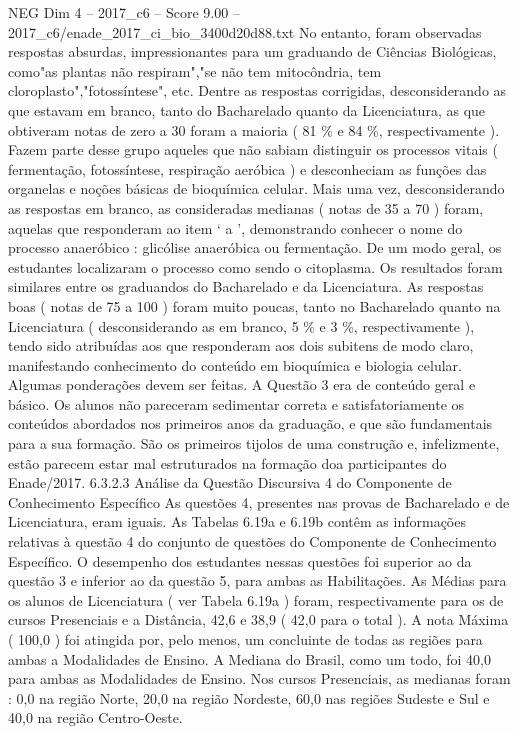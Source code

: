 \begin{textsample}{NEG Dim 4 – 2017\_c6 – Score 9.00 – 2017\_c6/enade\_2017\_ci\_bio\_3400d20d88.txt}
No entanto, foram observadas respostas absurdas, impressionantes para um graduando de Ciências Biológicas, como"as plantas não respiram","se não tem mitocôndria, tem cloroplasto","fotossíntese", etc.
Dentre as respostas corrigidas, desconsiderando as que estavam em branco, tanto do Bacharelado quanto da Licenciatura, as que obtiveram notas de zero a 30 foram a maioria ( 81 \% e 84 \%, respectivamente ).
Fazem parte desse grupo aqueles que não sabiam distinguir os processos vitais ( fermentação, fotossíntese, respiração aeróbica ) e desconheciam as funções das organelas e noções básicas de bioquímica celular.
Mais uma vez, desconsiderando as respostas em branco, as consideradas medianas ( notas de 35 a 70 ) foram, aquelas que responderam ao item ‘ a ’, demonstrando conhecer o nome do processo anaeróbico : glicólise anaeróbica ou fermentação.
De um modo geral, os estudantes localizaram o processo como sendo o citoplasma.
Os resultados foram similares entre os graduandos do Bacharelado e da Licenciatura.
As respostas boas ( notas de 75 a 100 ) foram muito poucas, tanto no Bacharelado quanto na Licenciatura ( desconsiderando as em branco, 5 \% e 3 \%, respectivamente ), tendo sido atribuídas aos que responderam aos dois subitens de modo claro, manifestando conhecimento do conteúdo em bioquímica e biologia celular.
Algumas ponderações devem ser feitas.
A Questão 3 era de conteúdo geral e básico.
Os alunos não pareceram sedimentar correta e satisfatoriamente os conteúdos abordados nos primeiros anos da graduação, e que são fundamentais para a sua formação.
São os primeiros tijolos de uma construção e, infelizmente, estão parecem estar mal estruturados na formação doa participantes do Enade/2017. 6.3.2.3 Análise da Questão Discursiva 4 do Componente de Conhecimento Específico As questões 4, presentes nas provas de Bacharelado e de Licenciatura, eram iguais.
As Tabelas 6.19a e 6.19b contêm as informações relativas à questão 4 do conjunto de questões do Componente de Conhecimento Específico.
O desempenho dos estudantes nessas questões foi superior ao da questão 3 e inferior ao da questão 5, para ambas as Habilitações.
As Médias para os alunos de Licenciatura ( ver Tabela 6.19a ) foram, respectivamente para os de cursos Presenciais e a Distância, 42,6 e 38,9 ( 42,0 para o total ).
A nota Máxima ( 100,0 ) foi atingida por, pelo menos, um concluinte de todas as regiões para ambas a Modalidades de Ensino.
A Mediana do Brasil, como um todo, foi 40,0 para ambas as Modalidades de Ensino.
Nos cursos Presenciais, as medianas foram : 0,0 na região Norte, 20,0 na região Nordeste, 60,0 nas regiões Sudeste e Sul e 40,0 na região Centro-Oeste.

\end{textsample}
